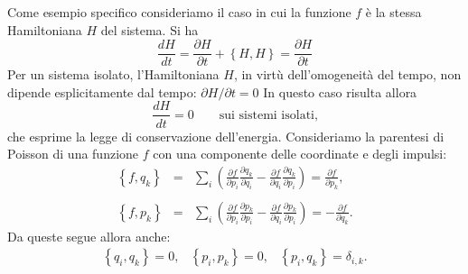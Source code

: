 \documentclass[a4paper,12pt,oneside]{book}
\begin{document}
Come esempio specifico consideriamo il caso in cui la funzione $f$ \`e la stessa Hamiltoniana $H$ del sistema. Si ha
\begin{equation}
\frac{d H}{d t} = \frac{\partial H}{\partial t} + \left\lbrace H,H \right\rbrace = \frac{\partial H}{\partial t}
\end{equation}
Per un sistema isolato, l'Hamiltoniana $H$, in virt\`u dell'omogeneit\`a del tempo, non dipende esplicitamente dal tempo: $\partial H/ \partial t=0$ In questo caso risulta allora
\begin{equation}
\frac{d H}{d t} = 0 \qquad \textrm{sui sistemi isolati,}
\end{equation}
che esprime la legge di conservazione dell'energia.
Consideriamo la parentesi di Poisson di una funzione $f$ con una componente delle coordinate e degli impulsi:
\begin{eqnarray}
\left\lbrace f,q_k \right\rbrace &=& \sum_i \left( \frac{\partial f}{\partial p_i} \frac{\partial q_k}{\partial q_i} - \frac{\partial f}{\partial q_i}\frac{\partial q_k}{\partial p_i} \right) = \frac{\partial f}{\partial p_k} ,\\
\nonumber \\
\left\lbrace f,p_k \right\rbrace &=& \sum_i \left( \frac{\partial f}{\partial p_i} \frac{\partial p_k}{\partial p_i} - \frac{\partial f}{\partial q_i}\frac{\partial p_k}{\partial p_i} \right) = - \frac{\partial f}{\partial q_k} .
\end{eqnarray}
Da queste segue allora anche:
\begin{equation}
\begin{matrix}
\left\lbrace q_i,q_k \right\rbrace =0 , &  \left\lbrace p_i,p_k \right\rbrace =0 , & \left\lbrace p_i,q_k \right\rbrace = \delta_{i,k} .
\end{matrix}
\end{equation}
\end{document}

